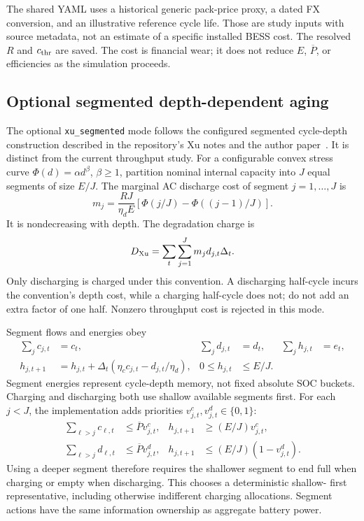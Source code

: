 \documentclass[11pt,a4paper]{article}
\begin{document}
The shared YAML uses a historical generic pack-price proxy, a dated FX
conversion, and an illustrative reference cycle life. Those are study inputs
with source metadata, not an estimate of a specific installed BESS cost.
The resolved $R$ and $c_{\rm thr}$ are saved. The cost is financial wear; it does
not reduce $E$, $\overline P$, or efficiencies as the simulation proceeds.

\subsection{Optional segmented depth-dependent aging}
The optional \texttt{xu\_segmented} mode follows the configured segmented
cycle-depth construction described in the repository's Xu notes and the author
paper~\cite{xu}. It is distinct from the current throughput study.
For a configurable convex stress curve $\Phi(d)=\alpha d^\beta$, $\beta\ge1$,
partition nominal internal capacity into $J$ equal segments of size $E/J$.
The marginal AC discharge cost of segment $j=1,\ldots,J$ is
\begin{equation}
 m_j=\frac{RJ}{\eta_d E}
       \left[\Phi(j/J)-\Phi((j-1)/J)\right].
\end{equation}
It is nondecreasing with depth. The degradation charge is
\begin{equation}
 D_{\rm Xu}=\sum_t\sum_{j=1}^J m_j d_{j,t}\Delta_t.
\end{equation}
Only discharging is charged under this convention. A discharging half-cycle
incurs the convention's depth cost, while a charging half-cycle does not; do not
add an extra factor of one half. Nonzero throughput cost is rejected in this mode.

Segment flows and energies obey
\begin{align}
 \sum_j c_{j,t}&=c_t,& \sum_j d_{j,t}&=d_t,&\sum_j h_{j,t}&=e_t,\\
 h_{j,t+1}&=h_{j,t}+\Delta_t(\eta_c c_{j,t}-d_{j,t}/\eta_d),&
 0\le h_{j,t}&\le E/J.
\end{align}
Segment energies represent cycle-depth memory, not fixed absolute SOC buckets.
Charging and discharging both use shallow available segments first. For each
$j<J$, the implementation adds priorities $v^c_{j,t},v^d_{j,t}\in\{0,1\}$:
\begin{align}
 \sum_{\ell>j}c_{\ell,t}&\le\overline P v^c_{j,t},&
 h_{j,t+1}&\ge(E/J)v^c_{j,t},\\
 \sum_{\ell>j}d_{\ell,t}&\le\overline P v^d_{j,t},&
 h_{j,t+1}&\le(E/J)(1-v^d_{j,t}).
\end{align}
Using a deeper segment therefore requires the shallower segment to end full
when charging or empty when discharging. This chooses a deterministic shallow-
first representative, including otherwise indifferent charging allocations.
Segment actions have the same information ownership as aggregate battery power.
\end{document}
